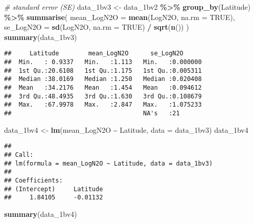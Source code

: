 \documentclass[
]{article}
\newenvironment{Shaded}{\begin{snugshade}}{\end{snugshade}}
\newcommand{\AttributeTok}[1]{\textcolor[rgb]{0.13,0.29,0.53}{#1}}
\newcommand{\CommentTok}[1]{\textcolor[rgb]{0.56,0.35,0.01}{\textit{#1}}}
\newcommand{\ConstantTok}[1]{\textcolor[rgb]{0.56,0.35,0.01}{#1}}
\newcommand{\FunctionTok}[1]{\textcolor[rgb]{0.13,0.29,0.53}{\textbf{#1}}}
\newcommand{\NormalTok}[1]{#1}
\newcommand{\OtherTok}[1]{\textcolor[rgb]{0.56,0.35,0.01}{#1}}
\newcommand{\SpecialCharTok}[1]{\textcolor[rgb]{0.81,0.36,0.00}{\textbf{#1}}}
\begin{document}
\begin{Shaded}
\begin{Highlighting}[]
\CommentTok{\# standard error (SE) }
\NormalTok{data\_1bv3 }\OtherTok{\textless{}{-}}\NormalTok{ data\_1bv2 }\SpecialCharTok{\%\textgreater{}\%}
  \FunctionTok{group\_by}\NormalTok{(Latitude) }\SpecialCharTok{\%\textgreater{}\%}
  \FunctionTok{summarise}\NormalTok{(}
    \AttributeTok{mean\_LogN2O =} \FunctionTok{mean}\NormalTok{(LogN2O, }\AttributeTok{na.rm =} \ConstantTok{TRUE}\NormalTok{),}
    \AttributeTok{se\_LogN2O =} \FunctionTok{sd}\NormalTok{(LogN2O, }\AttributeTok{na.rm =} \ConstantTok{TRUE}\NormalTok{) }\SpecialCharTok{/} \FunctionTok{sqrt}\NormalTok{(}\FunctionTok{n}\NormalTok{())}
\NormalTok{  )}
\FunctionTok{summary}\NormalTok{(data\_1bv3)}
\end{Highlighting}
\end{Shaded}

\begin{verbatim}
##     Latitude        mean_LogN2O      se_LogN2O       
##  Min.   : 0.9337   Min.   :1.113   Min.   :0.000000  
##  1st Qu.:20.6108   1st Qu.:1.175   1st Qu.:0.005311  
##  Median :38.0169   Median :1.250   Median :0.020408  
##  Mean   :34.2176   Mean   :1.454   Mean   :0.094612  
##  3rd Qu.:48.4935   3rd Qu.:1.630   3rd Qu.:0.108679  
##  Max.   :67.9978   Max.   :2.847   Max.   :1.075233  
##                                    NA's   :21
\end{verbatim}

\begin{Shaded}
\begin{Highlighting}[]
\NormalTok{data\_1bv4 }\OtherTok{\textless{}{-}} \FunctionTok{lm}\NormalTok{(mean\_LogN2O }\SpecialCharTok{\textasciitilde{}}\NormalTok{ Latitude, }\AttributeTok{data =}\NormalTok{ data\_1bv3)}
\NormalTok{data\_1bv4}
\end{Highlighting}
\end{Shaded}

\begin{verbatim}
## 
## Call:
## lm(formula = mean_LogN2O ~ Latitude, data = data_1bv3)
## 
## Coefficients:
## (Intercept)     Latitude  
##     1.84105     -0.01132
\end{verbatim}

\begin{Shaded}
\begin{Highlighting}[]
\FunctionTok{summary}\NormalTok{(data\_1bv4)}
\end{Highlighting}
\end{Shaded}
\end{document}
